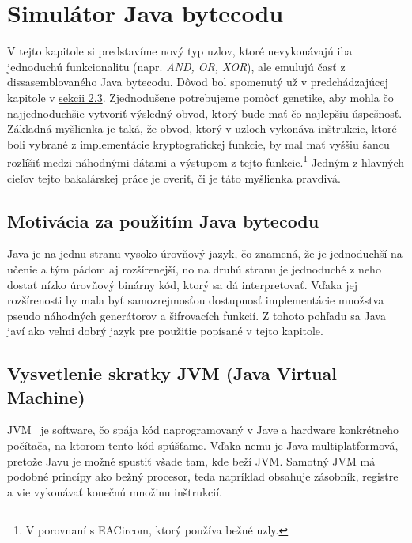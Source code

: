 \chapter{Simulátor Java bytecodu}
\label{chap:eacirc-jvmsim}

V tejto kapitole si predstavíme nový typ uzlov, ktoré nevykonávajú iba jednoduchú funkcionalitu (napr. \textit{AND, OR, XOR}), ale emulujú časť z dissasemblovaného Java bytecodu. Dôvod bol spomenutý už v predchádzajúcej kapitole v \hyperref[sec:nodes]{sekcii 2.3}. Zjednodušene potrebujeme pomôcť genetike, aby mohla čo najjednoduchšie vytvoriť výsledný obvod, ktorý bude mať čo najlepšiu úspešnosť. Základná myšlienka je taká, že obvod, ktorý v uzloch vykonáva inštrukcie, ktoré boli vybrané z implementácie kryptografickej funkcie, by mal mať vyššiu šancu rozlíšiť medzi náhodnými dátami a výstupom z tejto funkcie.\footnote{V porovnaní s EACircom, ktorý používa bežné uzly.} Jedným z hlavných cieľov tejto bakalárskej práce je overiť, či je táto myšlienka pravdivá. 

\section{Motivácia za použitím Java bytecodu}
\label{sec:java-bytecode}

Java je na jednu stranu vysoko úrovňový jazyk, čo znamená, že je jednoduchší na učenie a tým pádom aj rozšírenejší, no na druhú stranu je jednoduché z neho dostať nízko úrovňový binárny kód, ktorý sa dá interpretovať. Vďaka jej rozšírenosti  by mala byť samozrejmosťou dostupnosť implementácie množstva pseudo náhodných generátorov a šifrovacích funkcií. Z tohoto pohľadu sa Java javí ako veľmi dobrý jazyk pre použitie popísané v tejto kapitole.

\section{Vysvetlenie skratky JVM (Java Virtual Machine)}
\label{sec:jvm}

JVM~\parencite{JVM} je software, čo spája kód naprogramovaný v Jave a hardware konkrétneho počítača, na ktorom tento kód spúšťame. Vďaka nemu je Java multiplatformová, pretože Javu je možné spustiť všade tam, kde beží JVM. Samotný JVM má podobné princípy ako bežný procesor, teda napríklad obsahuje zásobník, registre a vie vykonávať konečnú množinu inštrukcií.

